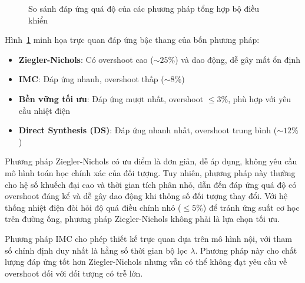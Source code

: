 \documentclass[../main.tex]{subfiles}
\begin{document}
\begin{figure}[H]
    \caption{So sánh đáp ứng quá độ của các phương pháp tổng hợp bộ điều khiển}
    \label{fig:method_comparison}
\end{figure}

Hình~\ref{fig:method_comparison} minh họa trực quan đáp ứng bậc thang của bốn phương pháp:
\begin{itemize}
    \item \textbf{Ziegler-Nichols}: Có overshoot cao ($\sim 25\%$) và dao động, dễ gây mất ổn định
    \item \textbf{IMC}: Đáp ứng nhanh, overshoot thấp ($\sim 8\%$)
    \item \textbf{Bền vững tối ưu}: Đáp ứng mượt nhất, overshoot $\leq 3\%$, phù hợp với yêu cầu nhiệt điện
    \item \textbf{Direct Synthesis (DS)}: Đáp ứng nhanh nhất, overshoot trung bình ($\sim 12\%$)
\end{itemize}

Phương pháp Ziegler-Nichols có ưu điểm là đơn giản, dễ áp dụng, không yêu cầu mô hình toán học chính xác của đối tượng. Tuy nhiên, phương pháp này thường cho hệ số khuếch đại cao và thời gian tích phân nhỏ, dẫn đến đáp ứng quá độ có overshoot đáng kể và dễ gây dao động khi thông số đối tượng thay đổi. Với hệ thống nhiệt điện đòi hỏi độ quá điều chỉnh nhỏ ($\leq 5\%$) để tránh ứng suất cơ học trên đường ống, phương pháp Ziegler-Nichols không phải là lựa chọn tối ưu.

Phương pháp IMC cho phép thiết kế trực quan dựa trên mô hình nội, với tham số chỉnh định duy nhất là hằng số thời gian bộ lọc $\lambda$. Phương pháp này cho chất lượng đáp ứng tốt hơn Ziegler-Nichols nhưng vẫn có thể không đạt yêu cầu về overshoot đối với đối tượng có trễ lớn.
\end{document}
